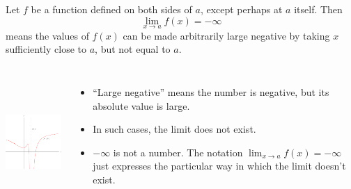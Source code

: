 \begin{frame}
\begin{definition}
Let $f$ be a function defined on both sides of $a$, except perhaps at $a$ itself.  Then
\[
\lim_{x\rightarrow a}f(x) = -\infty 
\]
means the values of $f(x)$ can be made arbitrarily large negative by taking $x$ sufficiently close to $a$, but not equal to $a$.
\end{definition}
\begin{columns}[c]
\ \includegraphics[height=4cm]{limits/pictures/02-02-neginf.pdf}%
\begin{itemize}
\item<2->  ``Large negative'' means the number is negative, but its absolute value is large.
\item<3->  In such cases, the limit does not exist.
\item<4->  $-\infty$ is not a number.  The notation $\lim_{x\rightarrow a}f(x) = -\infty$ just expresses the particular way in which the limit doesn't exist.
\end{itemize}
\end{columns}
\end{frame}


